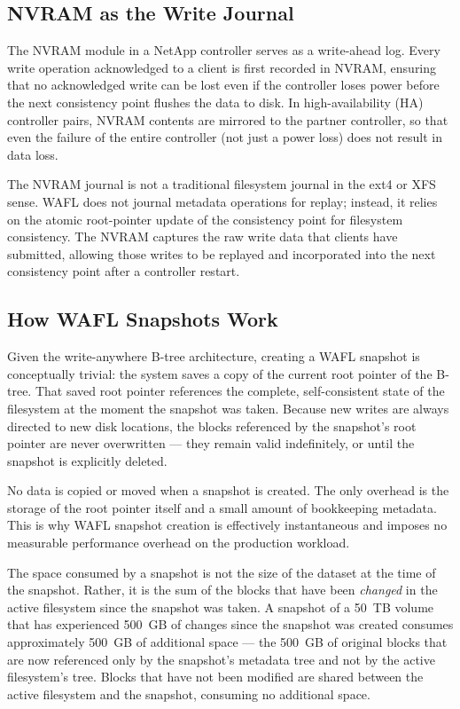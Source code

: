 \subsection{NVRAM as the Write Journal}

The NVRAM module in a NetApp controller serves as a write-ahead log. Every write operation acknowledged to a client is first recorded in NVRAM, ensuring that no acknowledged write can be lost even if the controller loses power before the next consistency point flushes the data to disk. In high-availability (HA) controller pairs, NVRAM contents are mirrored to the partner controller, so that even the failure of the entire controller (not just a power loss) does not result in data loss.

The NVRAM journal is not a traditional filesystem journal in the ext4 or XFS sense. WAFL does not journal metadata operations for replay; instead, it relies on the atomic root-pointer update of the consistency point for filesystem consistency. The NVRAM captures the raw write data that clients have submitted, allowing those writes to be replayed and incorporated into the next consistency point after a controller restart.

\subsection{How WAFL Snapshots Work}

Given the write-anywhere B-tree architecture, creating a WAFL snapshot is conceptually trivial: the system saves a copy of the current root pointer of the B-tree. That saved root pointer references the complete, self-consistent state of the filesystem at the moment the snapshot was taken. Because new writes are always directed to new disk locations, the blocks referenced by the snapshot's root pointer are never overwritten --- they remain valid indefinitely, or until the snapshot is explicitly deleted.

No data is copied or moved when a snapshot is created. The only overhead is the storage of the root pointer itself and a small amount of bookkeeping metadata. This is why WAFL snapshot creation is effectively instantaneous and imposes no measurable performance overhead on the production workload.

The space consumed by a snapshot is not the size of the dataset at the time of the snapshot. Rather, it is the sum of the blocks that have been \emph{changed} in the active filesystem since the snapshot was taken. A snapshot of a 50~TB volume that has experienced 500~GB of changes since the snapshot was created consumes approximately 500~GB of additional space --- the 500~GB of original blocks that are now referenced only by the snapshot's metadata tree and not by the active filesystem's tree. Blocks that have not been modified are shared between the active filesystem and the snapshot, consuming no additional space.

